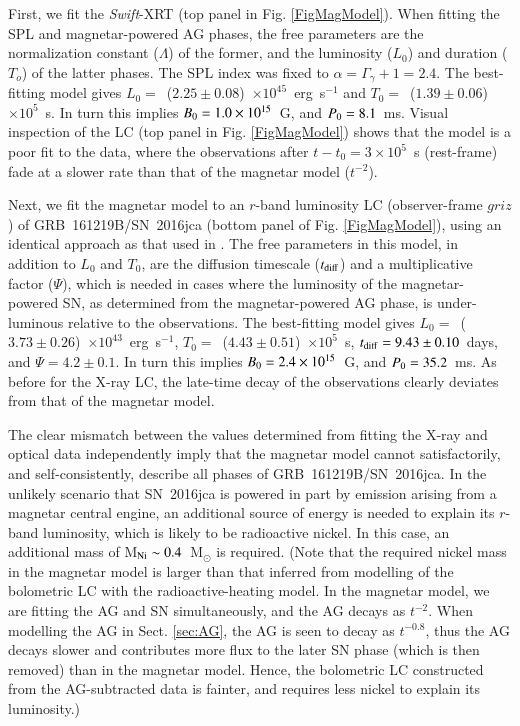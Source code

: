 \documentclass[traditabstract,longauth]{aa}
\begin{document}
First, we fit the \emph{Swift}-XRT (top panel in Fig. \ref{FigMagModel}).  When fitting the SPL and magnetar-powered AG phases, the free parameters are the normalization constant ($\Lambda$) of the former, and the luminosity ($L_{0}$) and duration ($T_{o}$) of the latter phases.  The SPL index was fixed to $\alpha=\Gamma_{\gamma} + 1 = 2.4$.  The best-fitting model gives $L_{0} =$~($2.25\pm0.08$)~$\times 10^{45}$~erg~s$^{-1}$ and $T_{0} =$~($1.39\pm0.06$)~$\times 10^{5}$~s.  In turn this implies $B_{\rm 0} = 1.0 \times 10^{15}$~G, and $P_{\rm 0} = 8.1$~ms.  Visual inspection of the LC (top panel in Fig. \ref{FigMagModel}) shows that the model is a poor fit to the data, where the observations after $t-t_0 = 3\times 10^5$~s (rest-frame) fade at a slower rate than that of the magnetar model ($t^{-2}$). 

Next, we fit the magnetar model to an $r$-band luminosity LC (observer-frame $griz$) of GRB~161219B/SN~2016jca (bottom panel of Fig. \ref{FigMagModel}), using an identical approach as that used in \citet{CJM16}.  The free parameters in this model, in addition to $L_0$ and $T_0$, are the diffusion timescale ($t_{\rm diff}$) and a multiplicative factor ($\Psi$), which is needed in cases where the luminosity of the magnetar-powered SN, as determined from the magnetar-powered AG phase, is under-luminous relative to the observations.  The best-fitting model gives $L_{0} =$~($3.73\pm0.26$)~$\times 10^{43}$~erg~s$^{-1}$, $T_{0} =$~($4.43\pm0.51$)~$\times 10^{5}$~s, $t_{\rm diff} = 9.43\pm0.10$~days, and $\Psi=4.2\pm0.1$. In turn this implies $B_{\rm 0} = 2.4 \times 10^{15}$~G, and $P_{\rm 0} = 35.2$~ms.  As before for the X-ray LC, the late-time decay of the observations clearly deviates from that of the magnetar model.

The clear mismatch between the values determined from fitting the X-ray and optical data independently imply that the magnetar model cannot satisfactorily, and self-consistently, describe all phases of GRB~161219B/SN~2016jca.  In the unlikely scenario that SN~2016jca is powered in part by emission arising from a magnetar central engine, an additional source of energy is needed to explain its $r$-band luminosity, which is likely to be radioactive nickel.  In this case, an additional mass of M$_{\rm Ni} \sim 0.4$~M$_{\odot}$ is required. (Note that the required nickel mass in the magnetar model is larger than that inferred from modelling of the bolometric LC with the radioactive-heating model.  In the magnetar model, we are fitting the AG and SN simultaneously, and the AG decays as $t^{-2}$.  When modelling the AG in Sect. \ref{sec:AG}, the AG is seen to decay as $t^{-0.8}$, thus the AG decays slower and contributes more flux to the later SN phase (which is then removed) than in the magnetar model. Hence, the bolometric LC constructed from the AG-subtracted data is fainter, and requires less nickel to explain its luminosity.)
\end{document}
